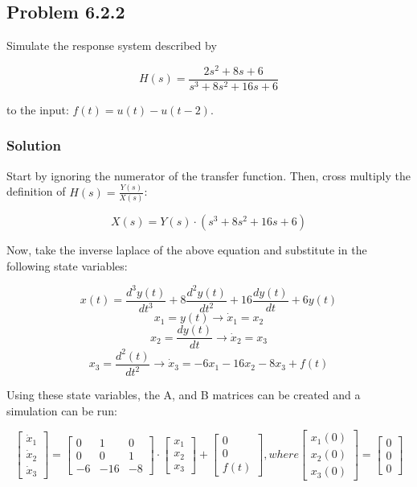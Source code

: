 \documentclass[11pt]{article}
\begin{document}
\hypertarget{problem-6.2.2}{%
\subsection{Problem 6.2.2}\label{problem-6.2.2}}

Simulate the response system described by

\[H(s)=\frac{2s^2+8s+6}{s^3+8s^2+16s+6}\]

to the input: \(f(t)=u(t)-u(t-2)\).

\hypertarget{solution}{%
\subsubsection{Solution}\label{solution}}

Start by ignoring the numerator of the transfer function. Then, cross
multiply the definition of \(H(s)=\frac{Y(s)}{X(s)}\):

\[X(s)=Y(s)\cdot (s^3+8s^2+16s+6)\]

Now, take the inverse laplace of the above equation and substitute in
the following state variables:

\[x(t)=\frac{d^3y(t)}{dt^3}+8\frac{d^2y(t)}{dt^2}+16\frac{dy(t)}{dt}+6y(t)\]
\[x_1=y(t)\rightarrow \dot{x}_1=x_2\]
\[x_2=\frac{dy(t)}{dt}\rightarrow \dot{x}_2=x_3\]
\[x_3=\frac{d^2(t)}{dt^2}\rightarrow \dot{x}_3=-6x_1-16x_2-8x_3+f(t)\]

Using these state variables, the A, and B matrices can be created and a
simulation can be run:

\[
\left[\begin{array}{c}
\dot{x}_1 \\ \dot{x}_2 \\ \dot{x}_3
\end{array}\right] = 
\left[\begin{array}{ccc} 
0 & 1 & 0 \\ 0 & 0 & 1 \\ -6 & -16 & -8
\end{array}\right] \cdot
\left[\begin{array}{c} 
x_1 \\ x_2 \\ x_3
\end{array}\right] + 
\left[\begin{array}{c}
0 \\ 0 \\ f(t)
\end{array}\right], where
\left[\begin{array}{c}
x_1(0) \\ x_2(0) \\ x_3(0)
\end{array}\right] = 
\left[\begin{array}{c}
0 \\ 0 \\ 0
\end{array}\right]
\]
\end{document}
